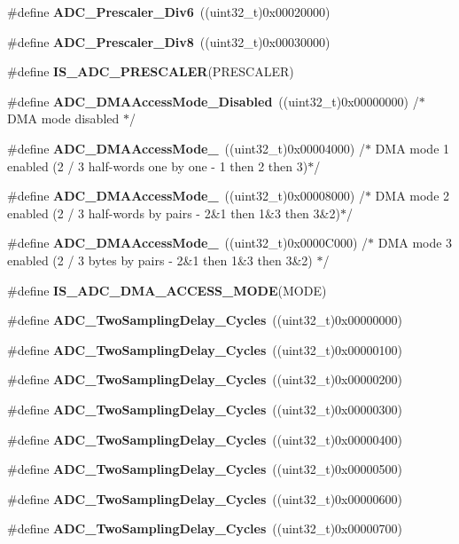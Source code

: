 \begin{DoxyCompactItemize}
\item 
\#define \textbf{ A\+D\+C\+\_\+\+Prescaler\+\_\+\+Div6}~((uint32\+\_\+t)0x00020000)
\item 
\#define \textbf{ A\+D\+C\+\_\+\+Prescaler\+\_\+\+Div8}~((uint32\+\_\+t)0x00030000)
\item 
\#define \textbf{ I\+S\+\_\+\+A\+D\+C\+\_\+\+P\+R\+E\+S\+C\+A\+L\+ER}(P\+R\+E\+S\+C\+A\+L\+ER)
\item 
\#define \textbf{ A\+D\+C\+\_\+\+D\+M\+A\+Access\+Mode\+\_\+\+Disabled}~((uint32\+\_\+t)0x00000000)     /$\ast$ D\+M\+A mode disabled $\ast$/
\item 
\#define \textbf{ A\+D\+C\+\_\+\+D\+M\+A\+Access\+Mode\+\_}~((uint32\+\_\+t)0x00004000)     /$\ast$ D\+M\+A mode 1 enabled (2 / 3 half-\/words one by one -\/ 1 then 2 then 3)$\ast$/
\item 
\#define \textbf{ A\+D\+C\+\_\+\+D\+M\+A\+Access\+Mode\+\_}~((uint32\+\_\+t)0x00008000)     /$\ast$ D\+M\+A mode 2 enabled (2 / 3 half-\/words by pairs -\/ 2\&1 then 1\&3 then 3\&2)$\ast$/
\item 
\#define \textbf{ A\+D\+C\+\_\+\+D\+M\+A\+Access\+Mode\+\_}~((uint32\+\_\+t)0x0000\+C000)     /$\ast$ D\+M\+A mode 3 enabled (2 / 3 bytes by pairs -\/ 2\&1 then 1\&3 then 3\&2) $\ast$/
\item 
\#define \textbf{ I\+S\+\_\+\+A\+D\+C\+\_\+\+D\+M\+A\+\_\+\+A\+C\+C\+E\+S\+S\+\_\+\+M\+O\+DE}(M\+O\+DE)
\item 
\#define \textbf{ A\+D\+C\+\_\+\+Two\+Sampling\+Delay\+\_\+Cycles}~((uint32\+\_\+t)0x00000000)
\item 
\#define \textbf{ A\+D\+C\+\_\+\+Two\+Sampling\+Delay\+\_\+Cycles}~((uint32\+\_\+t)0x00000100)
\item 
\#define \textbf{ A\+D\+C\+\_\+\+Two\+Sampling\+Delay\+\_\+Cycles}~((uint32\+\_\+t)0x00000200)
\item 
\#define \textbf{ A\+D\+C\+\_\+\+Two\+Sampling\+Delay\+\_\+Cycles}~((uint32\+\_\+t)0x00000300)
\item 
\#define \textbf{ A\+D\+C\+\_\+\+Two\+Sampling\+Delay\+\_\+Cycles}~((uint32\+\_\+t)0x00000400)
\item 
\#define \textbf{ A\+D\+C\+\_\+\+Two\+Sampling\+Delay\+\_\+Cycles}~((uint32\+\_\+t)0x00000500)
\item 
\#define \textbf{ A\+D\+C\+\_\+\+Two\+Sampling\+Delay\+\_\+Cycles}~((uint32\+\_\+t)0x00000600)
\item 
\#define \textbf{ A\+D\+C\+\_\+\+Two\+Sampling\+Delay\+\_\+Cycles}~((uint32\+\_\+t)0x00000700)

\end{DoxyCompactItemize}
